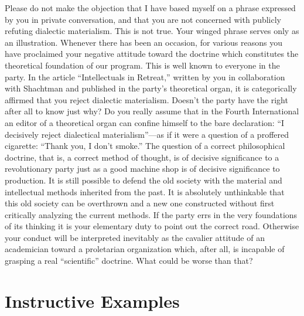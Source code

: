 Please do not make the objection that I have based myself on a phrase expressed by you in private conversation, and that you are not concerned with publicly refuting dialectic materialism. This is not true. Your winged phrase serves only as an illustration. Whenever there has been an occasion, for various reasons you have proclaimed your negative attitude toward the doctrine which constitutes the theoretical foundation of our program. This is well known to everyone in the party. In the article “Intellectuals in Retreat,” written by you in collaboration with Shachtman and published in the party’s theoretical organ, it is categorically affirmed that you reject dialectic materialism. Doesn’t the party have the right after all to know just why? Do you really assume that in the Fourth International an editor of a theoretical organ can confine himself to the bare declaration: “I decisively reject dialectical materialism”---as if it were a question of a proffered cigarette: “Thank you, I don’t smoke.” The question of a correct philosophical doctrine, that is, a correct method of thought, is of decisive significance to a revolutionary party just as a good machine shop is of decisive significance to production. It is still possible to defend the old society with the material and intellectual methods inherited from the past. It is absolutely unthinkable that this old society can be overthrown and a new one constructed without first critically analyzing the current methods. If the party errs in the very foundations of its thinking it is your elementary duty to point out the correct road. Otherwise your conduct will be interpreted inevitably as the cavalier attitude of an academician toward a proletarian organization which, after all, is incapable of grasping a real “scientific” doctrine. What could be worse than that?

\section*{Instructive Examples}

